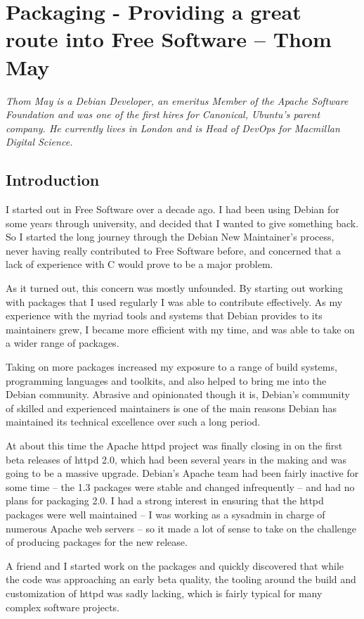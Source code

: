 \chapter{Packaging - Providing a great route into Free Software -- Thom May}

\textit{Thom May is a Debian Developer, an emeritus Member of the Apache Software Foundation and was one of the first hires for Canonical, Ubuntu's parent company. He currently lives in London and is Head of DevOps for Macmillan Digital Science.}

\section*{Introduction}
I started out in Free Software over a decade ago. I had been using Debian for some years through university, and decided that I wanted to give something back. So I started the long journey through the Debian New Maintainer's process, never having really contributed to Free Software before, and concerned that a lack of experience with C would prove to be a major problem.

As it turned out, this concern was mostly unfounded. By starting out working with packages that I used regularly I was able to contribute effectively. As my experience with the myriad tools and systems that Debian provides to its maintainers grew, I became more efficient with my time, and was able to take on a wider range of packages. 

Taking on more packages increased my exposure to a range of build systems, programming languages and toolkits, and also helped to bring me into the Debian community. Abrasive and opinionated though it is, Debian's community of skilled and experienced maintainers is one of the main reasons Debian has maintained its technical excellence over such a long period.

At about this time the Apache httpd project was finally closing in on the first beta releases of httpd 2.0, which had been several years in the making and was going to be a massive upgrade. Debian's Apache team had been fairly inactive for some time -- the 1.3 packages were stable and changed infrequently -- and had no plans for packaging 2.0. 
I had a strong interest in ensuring that the httpd packages were well maintained -- I was working as a sysadmin in charge of numerous Apache web servers -- so it made a lot of sense to take on the challenge of producing packages for the new release. 

A friend and I started work on the packages and quickly discovered that while the code was approaching an early beta quality, the tooling around the build and customization of httpd was sadly lacking, which is fairly typical for many complex software projects. 

